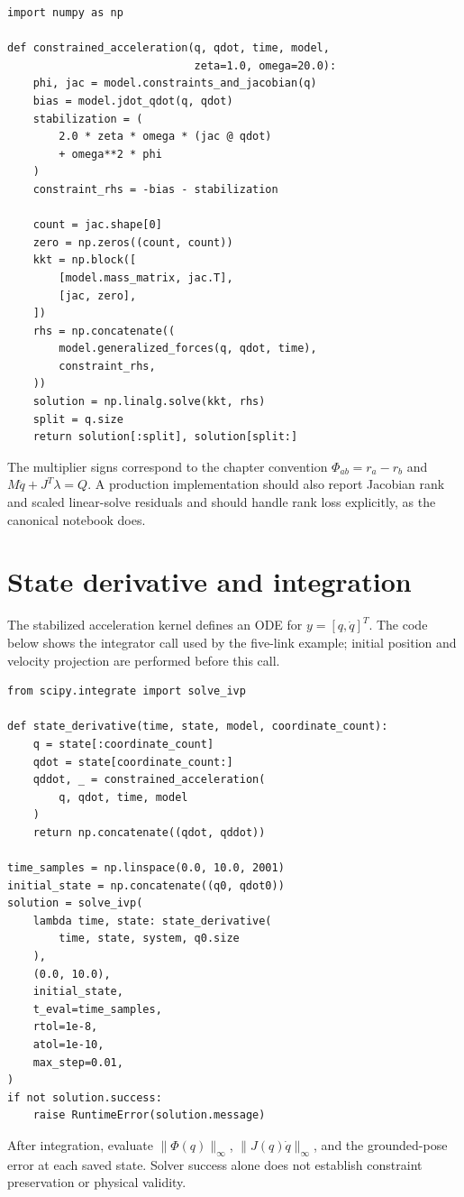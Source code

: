 \documentclass[../main.tex]{subfiles}
\begin{document}
\begin{lstlisting}[caption={KKT acceleration and reaction-force solve},label={lst:five-link-kkt}]
import numpy as np

def constrained_acceleration(q, qdot, time, model,
							 zeta=1.0, omega=20.0):
	phi, jac = model.constraints_and_jacobian(q)
	bias = model.jdot_qdot(q, qdot)
	stabilization = (
		2.0 * zeta * omega * (jac @ qdot)
		+ omega**2 * phi
	)
	constraint_rhs = -bias - stabilization

	count = jac.shape[0]
	zero = np.zeros((count, count))
	kkt = np.block([
		[model.mass_matrix, jac.T],
		[jac, zero],
	])
	rhs = np.concatenate((
		model.generalized_forces(q, qdot, time),
		constraint_rhs,
	))
	solution = np.linalg.solve(kkt, rhs)
	split = q.size
	return solution[:split], solution[split:]
\end{lstlisting}

The multiplier signs correspond to the chapter convention \(\Phi_{ab}=r_a-r_b\) and \(M\ddot q+J^T\lambda=Q\). A production implementation should also report Jacobian rank and scaled linear-solve residuals and should handle rank loss explicitly, as the canonical notebook does.

\section{State derivative and integration}
The stabilized acceleration kernel defines an ODE for \(y=[q,\dot q]^T\). The code below shows the integrator call used by the five-link example; initial position and velocity projection are performed before this call.

\begin{lstlisting}[caption={State derivative and adaptive integration},label={lst:five-link-integration}]
from scipy.integrate import solve_ivp

def state_derivative(time, state, model, coordinate_count):
	q = state[:coordinate_count]
	qdot = state[coordinate_count:]
	qddot, _ = constrained_acceleration(
		q, qdot, time, model
	)
	return np.concatenate((qdot, qddot))

time_samples = np.linspace(0.0, 10.0, 2001)
initial_state = np.concatenate((q0, qdot0))
solution = solve_ivp(
	lambda time, state: state_derivative(
		time, state, system, q0.size
	),
	(0.0, 10.0),
	initial_state,
	t_eval=time_samples,
	rtol=1e-8,
	atol=1e-10,
	max_step=0.01,
)
if not solution.success:
	raise RuntimeError(solution.message)
\end{lstlisting}

After integration, evaluate \(\|\Phi(q)\|_\infty\), \(\|J(q)\dot q\|_\infty\), and the grounded-pose error at each saved state. Solver success alone does not establish constraint preservation or physical validity.
\end{document}
